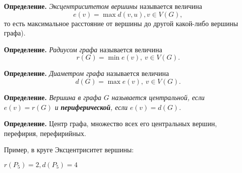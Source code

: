 \documentclass[a4paper, 12pt]{article}
\theoremstyle{definition}
\begin{document}
  \textbf{Определение.} \textit{Эксцентриситетом вершины} называется величина $$e(v)=\max d(v,u),v\in V(G),$$ то есть максимальное расстояние от вершины до другой какой-либо вершины графа).
  
  \textbf{Определение.} \textit{Радиусом графа} называется величина $$r(G)=\min e(v),\ v\in V(G).$$
  
  \textbf{Определение.} \textit{Диаметром графа} называется величина $$d(G)=\max e(v),\ v\in V(G).$$
  
  \textbf{Определение.} \textit{Вершина в графа $G$ называется \textit{центральной}, если $e(v)=r(G)$ и \textbf{периферической}, если $e(v)=d(G)$.}
  
  \textbf{Определение.} Центр графа, множество всех его центральных вершин, перефирия, перефирийных.
  
  Пример, в круге Эксцентриситет вершины:

  $r(P_5)=2, d(P_5)=4$
  
\end{document}
